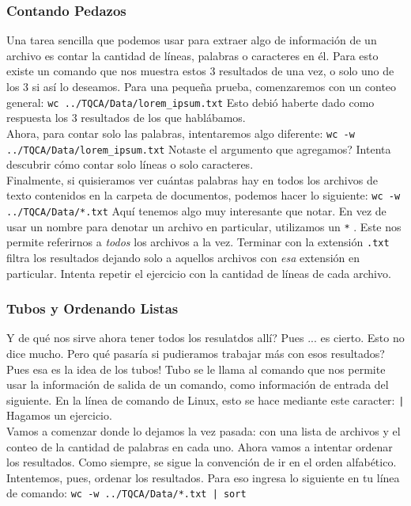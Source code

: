 \documentclass[10pt,letterpaper]{article}
\newcommand{\inlinecode}[1]{
\colorbox{light-gray}{\texttt{#1}}
}
\begin{document}
\subsubsection{Contando Pedazos}
Una tarea sencilla que podemos usar para extraer algo de informaci\'on de un archivo es contar la cantidad de l\'ineas, palabras o caracteres en \'el. Para esto existe un comando que nos muestra estos 3 resultados de una vez, o solo uno de los 3 si as\'i lo deseamos. Para una peque\~na prueba, comenzaremos con un conteo general: \inlinecode{wc ../TQCA/Data/lorem\_ipsum.txt} Esto debi\'o haberte dado como respuesta los 3 resultados de los que habl\'abamos.\\

Ahora, para contar solo las palabras, intentaremos algo diferente: \inlinecode{wc -w ../TQCA/Data/lorem\_ipsum.txt} Notaste el argumento que agregamos? Intenta descubrir c\'omo contar solo l\'ineas o solo caracteres.\\

Finalmente, si quisieramos ver cu\'antas palabras hay en todos los archivos de texto contenidos en la carpeta de documentos, podemos hacer lo siguiente: \inlinecode{wc -w ../TQCA/Data/*.txt} Aqu\'i tenemos algo muy interesante que notar. En vez de usar un nombre para denotar un archivo en particular, utilizamos un \inlinecode{*}. Este nos permite referirnos a \emph{todos} los archivos a la vez. Terminar con la extensi\'on \inlinecode{.txt} filtra los resultados dejando solo a aquellos archivos con \emph{esa} extensi\'on en particular. Intenta repetir el ejercicio con la cantidad de l\'ineas de cada archivo.

\subsubsection{Tubos y Ordenando Listas}
Y de qu\'e nos sirve ahora tener todos los resulatdos all\'i? Pues ... es cierto. Esto no dice mucho. Pero qu\'e pasar\'ia si pudieramos trabajar m\'as con esos resultados? Pues esa es la idea de los tubos! Tubo se le llama al comando que nos permite usar la informaci\'on de salida de un comando, como informaci\'on de entrada del siguiente. En la l\'inea de comando de Linux, esto se hace mediante este caracter: \inlinecode{|} Hagamos un ejercicio.\\

Vamos a comenzar donde lo dejamos la vez pasada: con una lista de archivos y el conteo de la cantidad de palabras en cada uno. Ahora vamos a intentar ordenar los resultados. Como siempre, se sigue la convenci\'on de ir en el orden alfab\'etico. Intentemos, pues, ordenar los resultados. Para eso ingresa lo siguiente en tu l\'inea de comando: \inlinecode{wc -w ../TQCA/Data/*.txt | sort}\\
\end{document}
